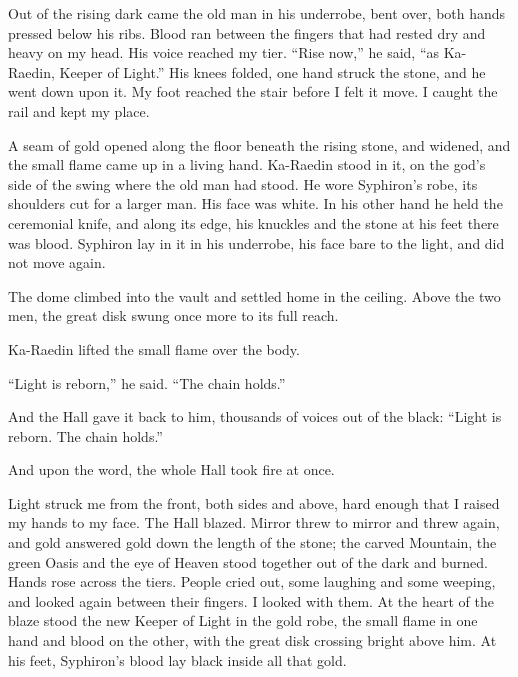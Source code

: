 Out of the rising dark came the old man in his underrobe, bent over, both hands pressed below his ribs. Blood ran between the fingers that had rested dry and heavy on my head. His voice reached my tier. ``Rise now,'' he said, ``as Ka-Raedin, Keeper of Light.'' His knees folded, one hand struck the stone, and he went down upon it. My foot reached the stair before I felt it move. I caught the rail and kept my place.\par

A seam of gold opened along the floor beneath the rising stone, and widened, and the small flame came up in a living hand. Ka-Raedin stood in it, on the god's side of the swing where the old man had stood. He wore Syphiron's robe, its shoulders cut for a larger man. His face was white. In his other hand he held the ceremonial knife, and along its edge, his knuckles and the stone at his feet there was blood. Syphiron lay in it in his underrobe, his face bare to the light, and did not move again.\par

The dome climbed into the vault and settled home in the ceiling. Above the two men, the great disk swung once more to its full reach.\par

Ka-Raedin lifted the small flame over the body.\par

``Light is reborn,'' he said. ``The chain holds.''\par

And the Hall gave it back to him, thousands of voices out of the black: ``Light is reborn. The chain holds.''\par

\ornament

And upon the word, the whole Hall took fire at once.\par

Light struck me from the front, both sides and above, hard enough that I raised my hands to my face. The Hall blazed. Mirror threw to mirror and threw again, and gold answered gold down the length of the stone; the carved Mountain, the green Oasis and the eye of Heaven stood together out of the dark and burned. Hands rose across the tiers. People cried out, some laughing and some weeping, and looked again between their fingers. I looked with them. At the heart of the blaze stood the new Keeper of Light in the gold robe, the small flame in one hand and blood on the other, with the great disk crossing bright above him. At his feet, Syphiron's blood lay black inside all that gold.\par

